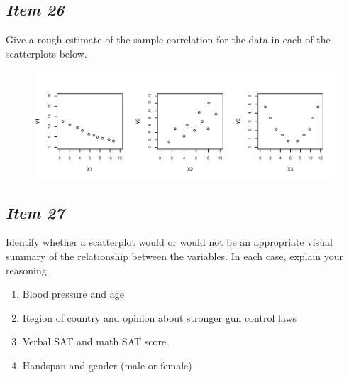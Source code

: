 \subsection{\textbf{\textit{Item 26}}}


Give a rough estimate of the sample correlation for the data in each of the scatterplots below.





\begin{figure}[ht]


\centering


\includegraphics[width=6.5in]{includes/Item19_R.pdf}


\end{figure}








\subsection{\textbf{\textit{Item 27}}}


Identify whether a scatterplot would or would not be an appropriate visual summary of the relationship between the variables. In each case, explain your reasoning. 


\begin{enumerate}[leftmargin=1cm, itemsep=.2em]


\item Blood pressure and age


\item Region of country and opinion about stronger gun control laws


\item Verbal SAT and math SAT score


\item Handspan and gender (male or female)


\end{enumerate}





